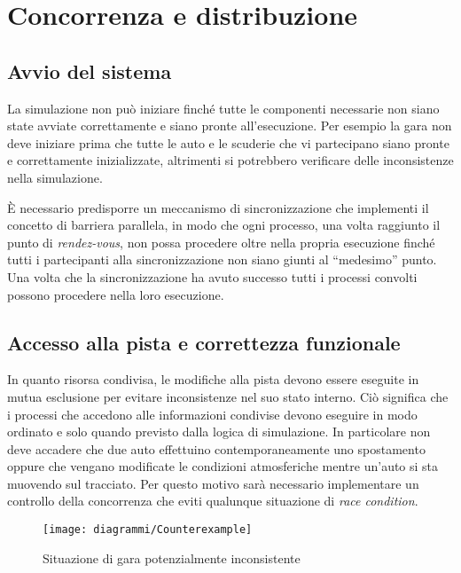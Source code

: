 \section{Concorrenza e distribuzione}
\subsection*{Avvio del sistema}
La simulazione non può iniziare finché tutte le componenti necessarie non siano state avviate correttamente e siano pronte all'esecuzione. Per esempio la gara non deve iniziare prima che tutte le auto e le scuderie che vi partecipano siano pronte e correttamente inizializzate, altrimenti si potrebbero verificare delle inconsistenze nella simulazione.

\`E necessario predisporre un meccanismo di sincronizzazione che implementi il concetto di barriera parallela, in modo che ogni processo, una volta raggiunto il punto di \textsl{rendez-vous}, non possa procedere oltre nella propria esecuzione finché tutti i partecipanti alla sincronizzazione non siano giunti al ``medesimo'' punto. Una volta che la sincronizzazione ha avuto successo tutti i processi convolti possono procedere nella loro esecuzione.

\subsection*{Accesso alla pista e correttezza funzionale}
\label{sec:motivazioneSched}
In quanto risorsa condivisa, le modifiche alla pista devono essere eseguite in mutua esclusione per evitare inconsistenze nel suo stato interno. Ciò significa che i processi che accedono alle informazioni condivise devono eseguire in modo ordinato e solo quando previsto dalla logica di simulazione. In particolare non deve accadere che due auto effettuino contemporaneamente uno spostamento oppure che vengano modificate le condizioni atmosferiche mentre un'auto si sta muovendo sul tracciato. Per questo motivo sarà necessario implementare un controllo della concorrenza che eviti qualunque situazione di \textit{race condition}.

\begin{figure}
\begin{center}
\texttt{[image: diagrammi/Counterexample]}
\caption{Situazione di gara potenzialmente inconsistente}
\label{fig:counterexample}
\end{center}
\end{figure}


